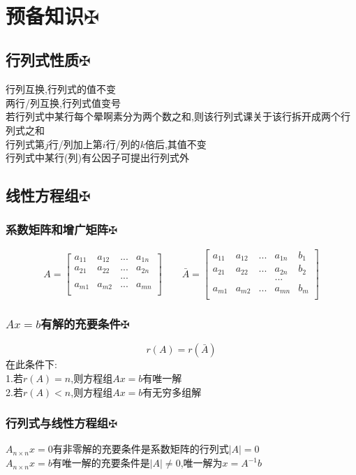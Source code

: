 \documentclass[11pt, a4paper, UTF8]{ctexart}
\begin{document}
\indent\\
\large
\raggedright
\def\fuck{\maltese}
\def\shit#1{#1\protect\hyperlink{catalog}{$\fuck$}}
\hypertarget{catalog}{}
\tableofcontents
\setcounter{secnumdepth}{-1}
\section{\shit{预备知识}}
\subsection{\shit{行列式性质}}
行列互换,行列式的值不变\\
两行/列互换,行列式值变号\\
若行列式中某行每个晕啊素分为两个数之和,则该行列式课关于该行拆开成两个行列式之和\\
行列式第$j$行/列加上第$i$行/列的$k$倍后,其值不变\\
行列式中某行(列)有公因子可提出行列式外
\subsection{\shit{线性方程组}}
\subsubsection{\shit{系数矩阵和增广矩阵}}
\[
A=\begin{bmatrix}
a_{11}&a_{12}&...&a_{1n}\\
a_{21}&a_{22}&...&a_{2n}\\
&&...&\\
a_{m1}&a_{m2}&...&a_{mn}\\
\end{bmatrix}
\qquad\bar A=\begin{bmatrix}
a_{11}&a_{12}&...&a_{1n}&b_1\\
a_{21}&a_{22}&...&a_{2n}&b_2\\
&&&...&\\
a_{m1}&a_{m2}&...&a_{mn}&b_m\\
\end{bmatrix}\]
\subsubsection{\shit{$Ax=b$有解的充要条件}}
\[r(A)=r(\bar A)\]
在此条件下:\\
1.若$r(A)=n$,则方程组$Ax=b$有唯一解\\
2.若$r(A)<n$,则方程组$Ax=b$有无穷多组解
\subsubsection{\shit{行列式与线性方程组}}
$A_{n\times n}x=0$有非零解的充要条件是系数矩阵的行列式$|A|=0$\\
$A_{n\times n}x=b$有唯一解的充要条件是$|A|\not=0$,唯一解为$x=A^{-1}b$
\end{document}
